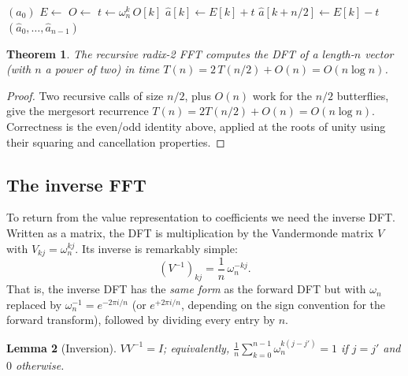 \documentclass[11pt]{article}
\newtheorem{theorem}{Theorem}[section]
\newtheorem{lemma}[theorem]{Lemma}
\begin{document}
\begin{algorithm}[h]
\caption{Recursive Radix-2 FFT}
\begin{algorithmic}[1]
     \Return $(a_0)$ \EndIf
    \State $E \gets$  
    \State $O \gets$  
        \State $t \gets \omega_n^{k}\, O[k]$ 
        \State $\hat a[k] \gets E[k] + t$
        \State $\hat a[k + n/2] \gets E[k] - t$
    \EndFor
    \State \Return $(\hat a_0, \ldots, \hat a_{n-1})$
\EndFunction
\end{algorithmic}
\end{algorithm}

\begin{theorem}
The recursive radix-2 FFT computes the DFT of a length-$n$ vector (with $n$ a power of two)
in time $T(n) = 2\,T(n/2) + O(n) = O(n \log n)$.
\end{theorem}

\begin{proof}
Two recursive calls of size $n/2$, plus $O(n)$ work for the $n/2$ butterflies, give the
mergesort recurrence $T(n) = 2T(n/2) + O(n) = O(n\log n)$. Correctness is the even/odd
identity above, applied at the roots of unity using their squaring and cancellation
properties.
\end{proof}

\subsection{The inverse FFT}

To return from the value representation to coefficients we need the inverse DFT. Written as a
matrix, the DFT is multiplication by the Vandermonde matrix $V$ with $V_{kj} = \omega_n^{kj}$.
Its inverse is remarkably simple:
\[
\left(V^{-1}\right)_{kj} = \frac{1}{n}\, \omega_n^{-kj}.
\]
That is, the inverse DFT has the \emph{same form} as the forward DFT but with $\omega_n$
replaced by $\omega_n^{-1} = e^{-2\pi i/n}$ (or $e^{+2\pi i/n}$, depending on the sign
convention for the forward transform), followed by dividing every entry by $n$.

\begin{lemma}[Inversion]
$V V^{-1} = I$; equivalently, $\frac{1}{n}\sum_{k=0}^{n-1} \omega_n^{k(j - j')} = 1$ if
$j = j'$ and $0$ otherwise.
\end{lemma}
\end{document}
